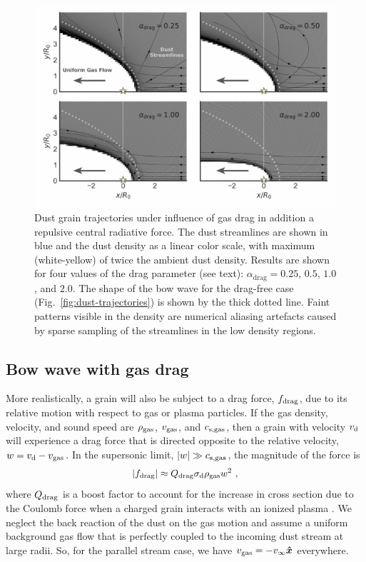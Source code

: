 \begin{figure}
  \centering
  \includegraphics[width=\linewidth]{figs/dust-couple-stream-annotate}
  \caption{Dust grain trajectories under influence of gas drag in
    addition a repulsive central radiative force.  The dust
    streamlines are shown in blue and the dust density as a linear
    color scale, with maximum (white-yellow) of twice the ambient dust
    density.  Results are shown for four values of the drag parameter
    (see text): \(\alpha_\text{drag} = 0.25\), \(0.5\), \(1.0\), and
    \(2.0\). The shape of the bow wave for the drag-free case
    (Fig.~\ref{fig:dust-trajectories}) is shown by the thick dotted
    line.  Faint patterns visible in the density are numerical
    aliasing artefacts caused by sparse sampling of the streamlines in
    the low density regions.}
  \label{fig:dust-wave-coupling}
\end{figure}


\subsection{Bow wave with gas drag}
\label{sec:bow-wave-drag}

More realistically, a grain will also be subject to a drag force,
\(f_{\text{drag}}\), due to its relative motion with respect to gas or plasma
particles. If the gas density, velocity, and sound speed are
\(\rho_{\text{gas}}\), \(v_{\text{gas}}\), and \(c_{\text{s,gas}}\), then a grain with velocity
\(v_{\text{d}}\) will experience a drag force that is directed opposite to
the relative velocity, \(w = v_{\text{d}} - v_{\text{gas}}\).  In the supersonic
limit, \(\lvert w\rvert \gg c_{\text{s,gas}}\), the magnitude of the force is
\begin{equation}
  \label{eq:dust-fdrag}
  \lvert f_{\text{drag}}\rvert \approx Q_{\text{drag}} \sigma_{\text{d}} \rho_{\text{gas}} w^2 \ ,
\end{equation}
where \(Q_{\text{drag}}\) is a boost factor to account for the increase in
cross section due to the Coulomb force when a charged grain interacts
with an ionized plasma \citep{Draine:1979a}.  We neglect the back
reaction of the dust on the gas motion and assume a uniform background
gas flow that is perfectly coupled to the incoming dust stream at
large radii.  So, for the parallel stream case, we have
\(v_{\text{gas}} = -v_\infty \bm{\hat{x}}\) everywhere.



